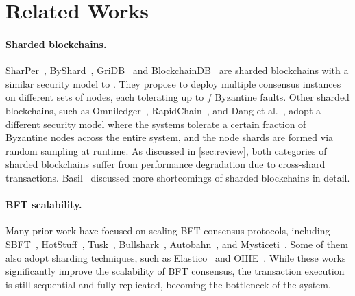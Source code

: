\section{Related Works}
\label{sec:rel}

\paragraph{Sharded blockchains.}
SharPer~\cite{amiri2021sharper}, ByShard~\cite{hellings2021byshard}, GriDB~\cite{hong2024gridb} and BlockchainDB~\cite{el2019blockchaindb} are sharded blockchains with a similar security model to \sys.
They propose to deploy multiple consensus instances on different sets of nodes, each tolerating up to $f$ Byzantine faults.
Other sharded blockchains, such as Omniledger~\cite{kokoris2018omniledger}, RapidChain~\cite{zamani2018rapidchain}, and Dang et al.~\cite{dang2019towards}, adopt a different security model where the systems tolerate a certain fraction of Byzantine nodes across the entire system, and the node shards are formed via random sampling at runtime.
As discussed in \cref{sec:review}, both categories of sharded blockchains suffer from performance degradation due to cross-shard transactions.
Basil~\cite{suri2021basil} discussed more shortcomings of sharded blockchains in detail.

\paragraph{BFT scalability.}
Many prior work have focused on scaling BFT consensus protocols, including SBFT~\cite{gueta2019sbft}, HotStuff~\cite{hotstuff}, Tusk~\cite{narwhal}, Bullshark~\cite{bullshark}, Autobahn~\cite{giridharan2024autobahn}, and Mysticeti~\cite{mysticeti}.
Some of them also adopt sharding techniques, such as Elastico~\cite{luu2016secure} and OHIE~\cite{yu2020ohie}.
While these works significantly improve the scalability of BFT consensus, the transaction execution is still sequential and fully replicated, becoming the bottleneck of the system.

